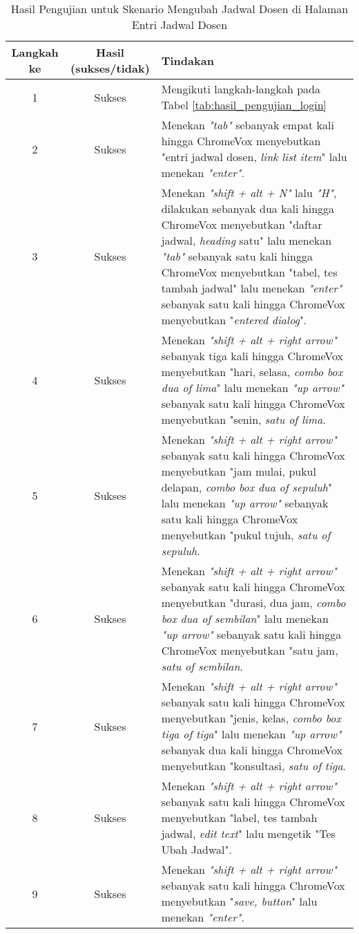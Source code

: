 \begin{table}[H]
    \centering 
    \caption{Hasil Pengujian untuk Skenario Mengubah Jadwal Dosen di Halaman Entri Jadwal Dosen}
    \label{tab:hasil_pengujian_mengubah_jadwal_dosen_di_halaman_entri_jadwal_dosen}
    \begin{tabular}{|c|c|p{10cm}|}
        \toprule
        Langkah ke & Hasil (sukses/tidak) & Tindakan \\

        \midrule
        1 & Sukses & Mengikuti langkah-langkah pada Tabel \ref{tab:hasil_pengujian_login} \\
        2 & Sukses & Menekan \textit{"tab"} sebanyak empat kali hingga ChromeVox menyebutkan "entri jadwal dosen, \textit{link list item}" lalu menekan \textit{"enter"}. \\
        3 & Sukses & Menekan \textit{"shift + alt + N"} lalu \textit{"H"}, dilakukan sebanyak dua kali hingga ChromeVox menyebutkan "daftar jadwal, \textit{heading} satu" lalu menekan \textit{"tab"} sebanyak satu kali hingga ChromeVox menyebutkan "tabel, tes tambah jadwal" lalu menekan \textit{"enter"} sebanyak satu kali hingga ChromeVox menyebutkan "\textit{entered dialog}". \\
        4 & Sukses & Menekan \textit{"shift + alt + right arrow"} sebanyak tiga kali hingga ChromeVox menyebutkan "hari, selasa, \textit{combo box dua of lima}" lalu menekan \textit{"up arrow"} sebanyak satu kali hingga ChromeVox menyebutkan "senin, \textit{satu of lima}. \\
        5 & Sukses & Menekan \textit{"shift + alt + right arrow"} sebanyak satu kali hingga ChromeVox menyebutkan "jam mulai, pukul delapan, \textit{combo box dua of sepuluh}" lalu menekan \textit{"up arrow"} sebanyak satu kali hingga ChromeVox menyebutkan "pukul tujuh, \textit{satu of sepuluh}. \\
        6 & Sukses & Menekan \textit{"shift + alt + right arrow"} sebanyak satu kali hingga ChromeVox menyebutkan "durasi, dua jam, \textit{combo box dua of sembilan}" lalu menekan \textit{"up arrow"} sebanyak satu kali hingga ChromeVox menyebutkan "satu jam, \textit{satu of sembilan}. \\
        7 & Sukses & Menekan \textit{"shift + alt + right arrow"} sebanyak satu kali hingga ChromeVox menyebutkan "jenis, kelas, \textit{combo box tiga of tiga}" lalu menekan \textit{"up arrow"} sebanyak dua kali hingga ChromeVox menyebutkan "konsultasi, \textit{satu of tiga}. \\
        8 & Sukses & Menekan \textit{"shift + alt + right arrow"} sebanyak satu kali hingga ChromeVox menyebutkan "label, tes tambah jadwal, \textit{edit text}" lalu mengetik "Tes Ubah Jadwal". \\ 
        9 & Sukses & Menekan \textit{"shift + alt + right arrow"} sebanyak satu kali hingga ChromeVox menyebutkan "\textit{save, button}" lalu menekan \textit{"enter"}. \\ 

        \bottomrule

    \end{tabular}
\end{table}

